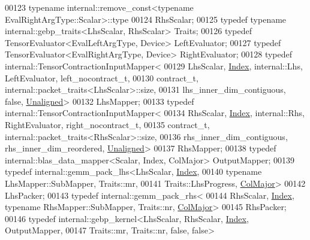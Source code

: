 \begin{DoxyCode}
00123         \textcolor{keyword}{typename} internal::remove\_const<typename EvalRightArgType::Scalar>::type
00124             RhsScalar;
00125     \textcolor{keyword}{typedef} \textcolor{keyword}{typename} internal::gebp\_traits<LhsScalar, RhsScalar> Traits;
00126     \textcolor{keyword}{typedef} TensorEvaluator<EvalLeftArgType, Device> LeftEvaluator;
00127     \textcolor{keyword}{typedef} TensorEvaluator<EvalRightArgType, Device> RightEvaluator;
00128     \textcolor{keyword}{typedef} internal::TensorContractionInputMapper<
00129         LhsScalar, \hyperlink{namespace_eigen_a62e77e0933482dafde8fe197d9a2cfde}{Index}, internal::Lhs, LeftEvaluator, left\_nocontract\_t,
00130         contract\_t, internal::packet\_traits<LhsScalar>::size,
00131         lhs\_inner\_dim\_contiguous, \textcolor{keyword}{false}, \hyperlink{group__enums_gga45fe06e29902b7a2773de05ba27b47a1ac935220b4c844108e183ebe30a4d5204}{Unaligned}>
00132         LhsMapper;
00133     \textcolor{keyword}{typedef} internal::TensorContractionInputMapper<
00134         RhsScalar, \hyperlink{namespace_eigen_a62e77e0933482dafde8fe197d9a2cfde}{Index}, internal::Rhs, RightEvaluator, right\_nocontract\_t,
00135         contract\_t, internal::packet\_traits<RhsScalar>::size,
00136         rhs\_inner\_dim\_contiguous, rhs\_inner\_dim\_reordered, \hyperlink{group__enums_gga45fe06e29902b7a2773de05ba27b47a1ac935220b4c844108e183ebe30a4d5204}{Unaligned}>
00137         RhsMapper;
00138     \textcolor{keyword}{typedef} internal::blas\_data\_mapper<Scalar, Index, ColMajor> OutputMapper;
00139     \textcolor{keyword}{typedef} internal::gemm\_pack\_lhs<LhsScalar, \hyperlink{namespace_eigen_a62e77e0933482dafde8fe197d9a2cfde}{Index},
00140                                     \textcolor{keyword}{typename} LhsMapper::SubMapper, Traits::mr,
00141                                     Traits::LhsProgress, \hyperlink{group__enums_ggaacded1a18ae58b0f554751f6cdf9eb13a0cbd4bdd0abcfc0224c5fcb5e4f6669a}{ColMajor}>
00142         LhsPacker;
00143     \textcolor{keyword}{typedef} internal::gemm\_pack\_rhs<
00144         RhsScalar, \hyperlink{namespace_eigen_a62e77e0933482dafde8fe197d9a2cfde}{Index}, \textcolor{keyword}{typename} RhsMapper::SubMapper, Traits::nr, 
      \hyperlink{group__enums_ggaacded1a18ae58b0f554751f6cdf9eb13a0cbd4bdd0abcfc0224c5fcb5e4f6669a}{ColMajor}>
00145         RhsPacker;
00146     \textcolor{keyword}{typedef} internal::gebp\_kernel<LhsScalar, RhsScalar, \hyperlink{namespace_eigen_a62e77e0933482dafde8fe197d9a2cfde}{Index}, OutputMapper,
00147                                   Traits::mr, Traits::nr, \textcolor{keyword}{false}, \textcolor{keyword}{false}>

\end{DoxyCode}
